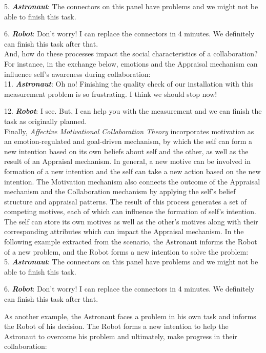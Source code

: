 \documentclass[12pt]{report}
\begin{document}
  5. \textbf{\textit{Astronaut}}: The connectors on this panel have problems and
  we might not be able to finish this task.

  6. \textbf{\textit{Robot}}: Don't worry! I can replace the connectors in 4
  minutes. We definitely can finish this task after that.\\

And, how do these processes impact the social characteristics of a
collaboration? For instance, in the exchange below, emotions and the Appraisal
mechanism can influence self's awareness during collaboration:\\

  11. \textbf{\textit{Astronaut}}: Oh no! Finishing the quality check of our
  installation with this measurement problem is so frustrating. I think we
  should stop now!

  12. \textbf{\textit{Robot}}: I see. But, I can help you with the measurement
  and we can finish the task as originally planned.\\

Finally, \textit{Affective Motivational Collaboration Theory} incorporates
motivation as an emotion-regulated and goal-driven mechanism, by which the self
can form a new intention based on its own beliefs about self and the other, as
well as the result of an Appraisal mechanism. In general, a new motive can
be involved in formation of a new intention and the self can take a new action
based on the new intention. The Motivation mechanism also connects the outcome
of the Appraisal mechanism and the Collaboration mechanism by applying the
self's belief structure and appraisal patterns. The result of this process
generates a set of competing motives, each of which can influence the
formation of self's intention. The self can store its own motives as well as the
other's motives along with their corresponding attributes which can impact the
Appraisal mechanism. In the following example extracted from the scenario, the
Astronaut informs the Robot of a new problem, and the Robot forms a new
intention to solve the problem:\\

  5. \textbf{\textit{Astronaut}}: The connectors on this panel have problems and
  we might not be able to finish this task.

  6. \textbf{\textit{Robot}}: Don't worry! I can replace the connectors in 4
  minutes. We definitely can finish this task after that.
  
As another example, the Astronaut faces a problem in his own task and informs
the Robot of his decision. The Robot forms a new intention to help the Astronaut
to overcome his problem and ultimately, make progress in their collaboration:\\
 
\end{document}
